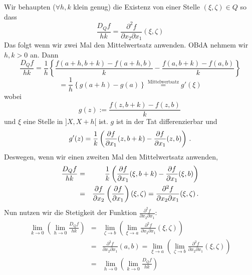 \begin{Bew}
Wir behaupten ($\forall h,k$ klein genug) die Existenz von einer Stelle $(\xi,\zeta)\in Q$ so dass
  \begin{equation}
    \label{e:1103231}
    \frac{D_Qf}{hk}=\frac{\partial^2f}{\partial x_2\partial x_1}(\xi, \zeta)
  \end{equation}
Das folgt wenn wir zwei Mal den Mittelwertsatz anwenden. OBdA
nehmem wir $h,k>0$ an. Dann 
  \[\frac{D_Qf}{hk}= \frac{1}{h}\left\{ \frac{f(a+h,b+k)-f(a+h,b)}{k}-\frac{f(a,b+k)-f(a,b)}{k} \right\}\]
  \[=\frac{1}{h}\left\{ g(a+h)-g(a) \right\}\stackrel{\text{Mittelwertsatz}}{=}g'(\xi)\]
wobei 
  \[g(z):=\frac{f(z,b+k)-f(z,b)}{k}\, \]
und $\xi$ eine Stelle in $]X, X+h[$ ist. $g$ ist in der Tat  differenzierbar und
\[g'(z)=\frac{1}{k}\left( \dfrac{\partial f}{\partial x_1}(z,b+k)-\dfrac{\partial f}{\partial x_1}(z,b) \right)\, .\]
Deswegen, wenn wir einen zweiten Mal den Mittelwertsatz anwenden,
\begin{eqnarray*}
\frac{D_Qf}{hk}
&=&\frac{1}{k}\left( \dfrac{\partial f}{\partial x_1}(\xi,b+k)-\dfrac{\partial f}{\partial x_1}(\xi,b) \right)\\
 &=&\dfrac{\partial f}{\partial x_2}\left( \dfrac{\partial f}{\partial x_1} \right)(\xi,\zeta) =
\frac{\partial^2 f}{\partial x_2\partial x_1} (\xi, \zeta)\, .
\end{eqnarray*}
Nun nutzen wir die Stetigkeit der Funktion $\frac{\partial^2 f}{\partial x_2\partial x_1}$:
\begin{eqnarray*} 
\lim_{k\to 0} \left(\lim_{h\to 0} \frac{D_Qf}{hk}\right)
&=& \lim_{\zeta\to b} \left(\lim_{\xi\to a} \frac{\partial^2 f}{\partial x_2\partial x_1} (\xi, \zeta)\right)\\
&=& \frac{\partial^2 f}{\partial x_2\partial x_1} (a,b) =  \lim_{\xi\to a} \left(\lim_{\zeta\to b} \frac{\partial^2 f}{\partial x_2\partial x_1} (\xi, \zeta)\right)\\
&=& \lim_{h\to 0} \left(\lim_{k\to 0} \frac{D_Qf}{hk}\right)
\end{eqnarray*}
\end{Bew}
